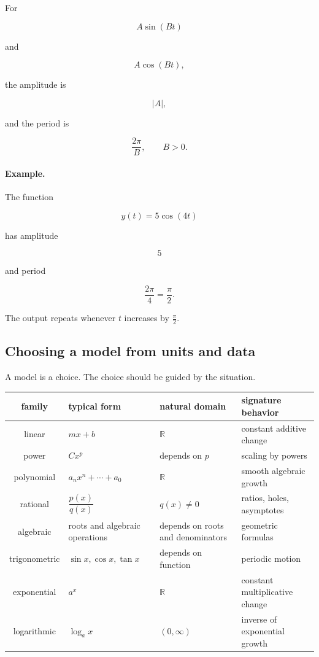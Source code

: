 For

\[
A\sin(Bt)
\]

and

\[
A\cos(Bt),
\]

the amplitude is

\[
|A|,
\]

and the period is

\[
\frac{2\pi}{B},
\qquad B>0.
\]

\paragraph{Example.}
The function

\[
y(t)=5\cos(4t)
\]

has amplitude

\[
5
\]

and period

\[
\frac{2\pi}{4}=\frac{\pi}{2}.
\]

The output repeats whenever \(t\) increases by \(\frac{\pi}{2}\).

\subsection{Choosing a model from units and data}
\label{subsec:choosing-model-units-data}

A model is a choice. The choice should be guided by the situation.

\begin{tabular}{c|>{\centering\arraybackslash}p{3.5cm}|>{\centering\arraybackslash}p{4cm}|>{\centering\arraybackslash}p{4.5cm}}
\textbf{family} & \textbf{typical form} & \textbf{natural domain} & \textbf{signature behavior} \\ \hline
linear & \(mx+b\) & \(\mathbb R\) & constant additive change \\
power & \(Cx^p\) & depends on \(p\) & scaling by powers \\
polynomial & \(a_nx^n+\cdots+a_0\) & \(\mathbb R\) & smooth algebraic growth \\
rational & \(\dfrac{p(x)}{q(x)}\) & \(q(x)\neq0\) & ratios, holes, asymptotes \\
algebraic & roots and algebraic operations & depends on roots and denominators & geometric formulas \\
trigonometric & \(\sin x,\cos x,\tan x\) & depends on function & periodic motion \\
exponential & \(a^x\) & \(\mathbb R\) & constant multiplicative change \\
logarithmic & \(\log_a x\) & \((0,\infty)\) & inverse of exponential growth
\end{tabular}

